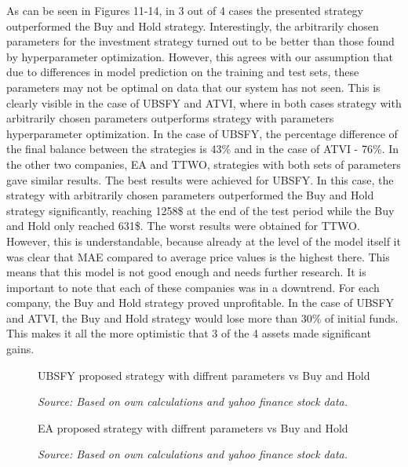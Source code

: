 \documentclass[11pt]{article} %
\begin{document}
	 As can be seen in Figures 11-14, in 3 out of 4 cases the presented strategy outperformed the Buy and Hold strategy. Interestingly, the arbitrarily chosen parameters for the investment strategy turned out to be better than those found by hyperparameter optimization. However, this agrees with our assumption that due to differences in model prediction on the training and test sets, these parameters may not be optimal on data that our system has not seen. This is clearly visible in the case of UBSFY and ATVI, where in both cases strategy with arbitrarily chosen parameters outperforms strategy with parameters hyperparameter optimization. In the case of UBSFY, the percentage difference of the final balance between the strategies is 43\% and in the case of ATVI - 76\%. In the other two companies, EA and TTWO, strategies with both sets of parameters gave similar results. The best results were achieved for UBSFY. In this case, the strategy with arbitrarily chosen parameters outperformed the Buy and Hold strategy significantly, reaching 1258\$ at the end of the test period while the Buy and Hold only reached 631\$. The worst results were obtained for TTWO. However, this is understandable, because already at the level of the model itself it was clear that MAE compared to average price values is the highest there. This means that this model is not good enough and needs further research. It is important to note that each of these companies was in a downtrend. For each company, the Buy and Hold strategy proved unprofitable. In the case of UBSFY and ATVI, the Buy and Hold strategy would lose more than 30\% of initial funds. This makes it all the more optimistic that 3 of the 4 assets made significant gains. 

\begin{figure}[H]
\caption{UBSFY proposed strategy with diffrent parameters vs Buy and Hold}
\begin{adjustbox}{width=1.3\textwidth,center}

\end{adjustbox}
\caption*{\textit{Source: Based on own calculations and yahoo finance stock data.}}
\end{figure}

\begin{figure}[H]
\caption{EA proposed strategy with diffrent parameters vs Buy and Hold}
\begin{adjustbox}{width=1.3\textwidth,center}

\end{adjustbox}
\caption*{\textit{Source: Based on own calculations and yahoo finance stock data.}}
\end{figure}
\end{document}
